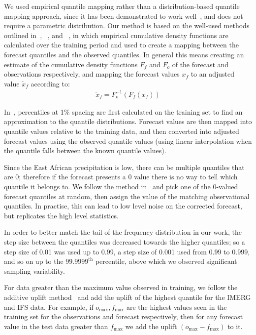 \documentclass{article}
\begin{document}
We used empirical quantile mapping rather than a distribution-based quantile mapping approach, since it has been demonstrated to work well~\citep{gudmundsson_quantile_2012}, and does not require a parametric distribution. Our method is based on the well-used methods outlined in~\cite{boe_statistical_2007}, ~\citet{deque_frequency_2007}, and ~\citet{maraun_model_2017}, in which empirical cumulative density functions are calculated over the training period and used to create a mapping between the forecast quantiles and the observed quantiles. In general this means creating an estimate of the cumulative density functions $F_{f}$ and $F_{o}$ of the forecast and observations respectively, and mapping the forecast values $x_{f}$ to an adjusted value $\tilde{x}_f$ according to:
\begin{align}
    \tilde{x}_f = F^{-1}_o (F_f (x_f))
\end{align}

In~\cite{boe_statistical_2007}, percentiles at 1\% spacing are first calculated on the training set to find an approximation to the quantile distributions. Forecast values are then mapped into quantile values relative to the training data, and then converted into adjusted forecast values using the observed quantile values (using linear interpolation when the quantile falls between the known quantile values). 

Since the East African precipitation is low, there can be multiple quantiles that are 0; therefore if the forecast presents a 0 value there is no way to tell which quantile it belongs to. We follow the method in~\cite{boe_statistical_2007} and pick one of the 0-valued forecast quantiles at random, then assign the value of the matching observational quantiles. In practise, this can lead to low level noise on the corrected forecast, but replicates the high level statistics.

In order to better match the tail of the frequency distribution in our work, the step size between the quantiles was decreased towards the higher quantiles; so a step size of 0.01 was used up to 0.99, a step size of 0.001 used from 0.99 to 0.999, and so on up to the $99.9999^{\text{th}}$ percentile, above which we observed significant sampling variability.


For data greater than the maximum value observed in training, we follow the additive uplift method~\citep{boe_statistical_2007, deque_frequency_2007} and add the uplift of the highest quantile for the IMERG and IFS data. For example, if $o_{\text{max}},f_{\text{max}}$ are the highest values seen in the training set for the observations and forecast respectively, then for any forecast value in the test data greater than $f_{\text{max}}$ we add the uplift $(o_{\text{max}} - f_{\text{max}})$ to it. 
\end{document}
